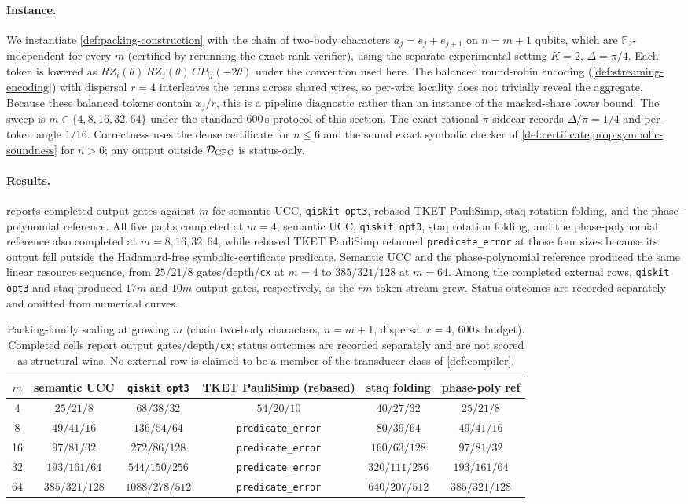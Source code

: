\documentclass[aps,prx,reprint,floatfix,superscriptaddress]{revtex4-2}
\newcommand{\Ftwo}{\mathbb{F}_2}
\newcommand{\pkResultsSummary}{All five paths completed at $m=4$; semantic
UCC, \texttt{qiskit opt3}, staq rotation folding, and the phase-polynomial
reference also completed at $m=8,16,32,64$, while rebased TKET PauliSimp
returned \texttt{predicate\_error} at those four sizes because its output
fell outside the Hadamard-free symbolic-certificate predicate. Semantic UCC
and the phase-polynomial reference produced the same linear resource sequence,
from $25/21/8$ gates/depth/\texttt{cx} at $m=4$ to $385/321/128$ at $m=64$.
Among the completed external rows, \texttt{qiskit opt3} and staq produced
$17m$ and $10m$ output gates, respectively, as the $r m$ token stream grew.
Status outcomes are recorded separately and omitted from numerical curves.}
\begin{document}
\paragraph{Instance.}
We instantiate \cref{def:packing-construction} with the chain of two-body
characters $a_j = e_j + e_{j+1}$ on $n = m+1$ qubits, which are
$\Ftwo$-independent for every $m$ (certified by rerunning the exact rank
verifier), using the separate experimental setting $K=2$, $\Delta=\pi/4$.
Each token is lowered as
$RZ_i(\theta)\,RZ_j(\theta)\,CP_{ij}(-2\theta)$ under the convention
used here. The balanced round-robin encoding
(\cref{def:streaming-encoding}) with dispersal $r = 4$ interleaves the
terms across shared wires, so per-wire locality does not trivially reveal
the aggregate.  Because these balanced tokens contain $x_j/r$, this is a
pipeline diagnostic rather than an instance of the masked-share lower
bound. The sweep is $m \in \{4, 8, 16, 32, 64\}$ under the
standard 600\,s protocol of this section.  The exact rational-$\pi$ sidecar
records $\Delta/\pi=1/4$ and per-token angle $1/16$.  Correctness uses the
dense certificate for $n\leq6$ and the sound exact symbolic checker of
\cref{def:certificate,prop:symbolic-soundness} for $n>6$; any output outside
$\mathcal D_{\rm CPC}$ is status-only.

\paragraph{Results.}
 reports completed output gates against $m$
for semantic UCC, \texttt{qiskit opt3}, rebased TKET PauliSimp, staq
rotation folding, and the phase-polynomial reference.
\pkResultsSummary

\begin{table}[!t]
\centering
\small
\begin{tabular}{cccccc}
\toprule
$m$ & semantic UCC & \texttt{qiskit opt3} & TKET PauliSimp (rebased) & staq folding & phase-poly ref \\
\midrule
4  & $25/21/8$ & $68/38/32$ & $54/20/10$ & $40/27/32$ & $25/21/8$ \\
8  & $49/41/16$ & $136/54/64$ & \texttt{predicate\_error} & $80/39/64$ & $49/41/16$ \\
16 & $97/81/32$ & $272/86/128$ & \texttt{predicate\_error} & $160/63/128$ & $97/81/32$ \\
32 & $193/161/64$ & $544/150/256$ & \texttt{predicate\_error} & $320/111/256$ & $193/161/64$ \\
64 & $385/321/128$ & $1088/278/512$ & \texttt{predicate\_error} & $640/207/512$ & $385/321/128$ \\
\bottomrule
\end{tabular}
\caption{Packing-family scaling at growing $m$ (chain two-body
characters, $n = m+1$, dispersal $r = 4$, 600\,s budget). Completed cells
report output gates/depth/\texttt{cx}; status outcomes are recorded separately and are not
scored as structural wins. No external row is claimed to be a member of
the transducer class of \cref{def:compiler}.}
\label{tab:packing-scaling}
\end{table}
\end{document}
